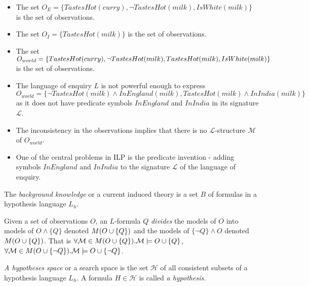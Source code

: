 \begin{exmp}
\begin{itemize}
\item The set $O_E=\{TastesHot(curry), \neg TastesHot(milk), IsWhite(milk)\}$ is the set of observations.
\item The set $O_I=\{TastesHot(milk)\}$ is the set of observations.
\item The set $O_{world}=\{TastesHot(curry), \neg TastesHot(milk), TastesHot(milk), \\
IsWhite(milk)\}$ is the set of observations.
\end{itemize}
\end{exmp}

\begin{remark}
\begin{itemize}
\item The language of enquiry $L$ is not powerful enough to express $O_{world}=\{\neg TastesHot(milk) \land InEngland(milk), TastesHot(milk) \land InIndia(milk)\}$
 as it does not have predicate symbols $InEngland$ and $InIndia$ in its signature $\mathcal{L}$.
\item The inconsistency in the observations implies that there is no $\mathcal{L}$-structure $\mathcal{M}$ of $O_{world}$.
\item One of the central problems in ILP is the predicate invention - adding symbols $InEngland$ and $InIndia$ to the signature $\mathcal{L}$ of the language of enquiry.
\end{itemize}
\end{remark}

\begin{defn}
The \emph{background knowledge} or a current induced theory is a set $B$ of formulas in a hypothesis language $L_h$.
\end{defn}

\begin{note}
Given a set of observations $O$, an $L$-formula $Q$ \emph{divides} the models of $O$ into models of $O \wedge \{Q\}$ denoted $M(O \cup \{Q\})$ and the models of $\{\neg Q\} \wedge O$ denoted $M(O \cup \{Q\})$. That is $\forall \mathcal{M} \in M(O \cup \{Q\}). \mathcal{M} \models O \cup \{Q\}$,
$\forall \mathcal{M} \in M(O \cup \{\neg Q\}). \mathcal{M} \models O \cup \{\neg Q\}$.
\end{note}

\begin{defn}
\emph{A hypotheses space} or a search space is the set $\mathcal{H}$ of all consistent subsets of a hypothesis language $L_h$. A formula $H \in \mathcal{H}$ is called \emph{a hypothesis}.
\end{defn}

